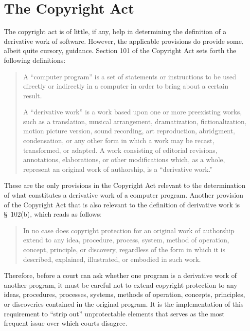 \section{The Copyright Act}

The copyright act is of little, if any, help in determining the definition
of a derivative work of software. However, the applicable provisions do
provide some, albeit quite cursory, guidance. Section 101 of the Copyright
Act sets forth the following definitions:

\begin{quotation}
A ``computer program'' is a set of statements or instructions to be used
directly or indirectly in a computer in order to bring about a certain
result.

A ``derivative work'' is a work based upon one or more preexisting works,
such as a translation, musical arrangement, dramatization,
fictionalization, motion picture version, sound recording, art
reproduction, abridgment, condensation, or any other form in which a work
may be recast, transformed, or adapted. A work consisting of editorial
revisions, annotations, elaborations, or other modifications which, as a
whole, represent an original work of authorship, is a ``derivative work.''
\end{quotation}

These are the only provisions in the Copyright Act relevant to the
determination of what constitutes a derivative work of a computer
program. Another provision of the Copyright Act that is also relevant to
the definition of derivative work is \S~102(b), which reads as follows:

\begin{quotation}
In no case does copyright protection for an original work of authorship
extend to any idea, procedure, process, system, method of operation,
concept, principle, or discovery, regardless of the form in which it is
described, explained, illustrated, or embodied in such work.
\end{quotation}

Therefore, before a court can ask whether one program is a derivative work
of another program, it must be careful not to extend copyright protection
to any ideas, procedures, processes, systems, methods of operation,
concepts, principles, or discoveries contained in the original program. It
is the implementation of this requirement to ``strip out'' unprotectable
elements that serves as the most frequent issue over which courts
disagree.

